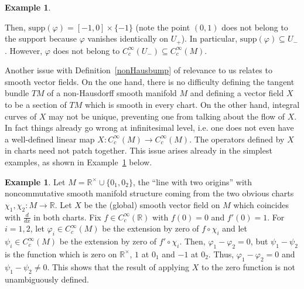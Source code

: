 \documentclass[12pt]{article}
\theoremstyle{plain}
\theoremstyle{definition}
\newtheorem{ex}[thm]{Example}
\newcommand{\R}{\mathbb{R}}
\numberwithin{equation}{section}
\begin{document}
\begin{ex}
\begin{center}
\hfill
{}
\hfill
\end{center}
Then, $\mathrm{supp}(\varphi) = [-1,0]  \times \{-1\}$  (note the point $(0,1)$ does not belong to the support because $\varphi$ vanishes identically on $U_+$). In particular, $\mathrm{supp}(\varphi) \subseteq U_-$. However, $\varphi$ does not belong to $C_c^\infty(U_-) \subseteq C_c^\infty(M)$.
\end{ex}




Another issue with Definition~\ref{nonHausbump} of relevance to us relates to smooth vector fields. On the one hand, there is no difficulty defining the tangent bundle $TM$ of a non-Hausdorff smooth manifold $M$ and defining a vector field $X$ to be a section of $TM$  which is smooth in every chart. On the other hand, integral curves of $X$ may not be unique, preventing one from talking about the flow of $X$. In fact things already go wrong at infinitesimal level, i.e. one does not even have a well-defined linear map $X:C_c^\infty(M)\to C_c^\infty(M)$. The  operators defined by $X$ in charts need not patch together. This issue arises already in the simplest examples, as shown in Example~\ref{badvecfld} below. 







\begin{ex}\label{badvecfld}
Let $M=\R^\times \cup \{0_1,0_2\}$, the ``line with two origins'' with noncommutative smooth manifold structure coming from the two obvious charts $\chi_1,\chi_2:M\to\R$.  Let $X$ be the (global) smooth vector field on $M$ which coincides with $\frac{d}{dx}$ in both charts. Fix $f \in C_c^\infty(\R)$ with $f(0)=0$ and $f'(0)=1$. For $i=1,2$, let $\varphi_i \in C_c^\infty(M)$ be the extension by zero of $f \circ \chi_i$ and let $\psi_i \in C_c^\infty(M)$ be the extension by zero of $f' \circ \chi_i$. Then, $\varphi_1 - \varphi_2 = 0$, but $\psi_1 - \psi_2$ is the function which is zero on $\R^\times$, $1$ at $0_1$ and $-1$ at $0_2$. Thus, $\varphi_1 - \varphi_2 = 0$ and $\psi_1 - \psi_2\neq 0$. This shows that the result of applying   $X$ to the zero function is not unambiguously defined.
\end{ex}
\end{document}
